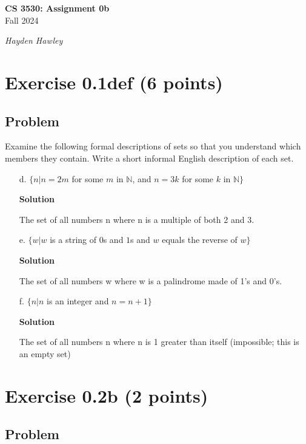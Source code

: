 \documentclass{article}
\begin{document}
\begin{empfile}

\begin{center}
\textbf{\Large CS 3530: Assignment 0b} \\[2mm]
Fall 2024

\emph{Hayden Hawley}
\end{center}

\raggedright

\section*{Exercise 0.1def (6 points)}

\subsection*{Problem}

Examine the following formal descriptions of sets so that you understand which members they contain.  Write a short informal English description of each set.

\begin{itemize}
\item[d.] $\{ n | n = 2m $ for some $m$ in $\mathbb{N}$, and $n = 3k$ for some $k$ in $\mathbb{N} \}$

\textbf{Solution}

The set of all numbers n where n is a multiple of both 2 and 3.

\item[e.] $\{ w | w $ is a string of $0$s and $1$s and $w$ equals the reverse of $w \}$

\textbf{Solution}

The set of all numbers w where w is a palindrome made of 1's and 0's.

\item[f.] $\{ n | n $ is an integer and $n = n + 1 \}$

\textbf{Solution}

The set of all numbers n where n is 1 greater than itself (impossible; this is an empty set)

\end{itemize}

\section*{Exercise 0.2b (2 points)}

\subsection*{Problem}


\end{empfile}
\end{document}
